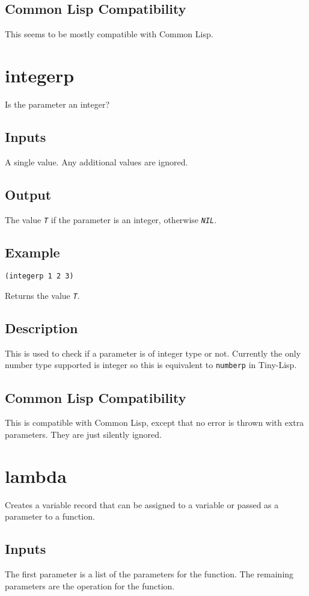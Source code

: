 \documentclass[10pt, openany]{book}
\newcommand{\constant}[1]{\emph{\texttt{#1}}}
\newcommand{\keyword}[1]{\texttt{#1}}
\newcommand{\tl}{Tiny-Lisp}
\newcommand{\cl}{Common Lisp}
\begin{document}
\subsection{Common Lisp Compatibility}
This seems to be mostly compatible with \cl.

\section{integerp}
Is the parameter an integer?
\subsection{Inputs}
A single value.  Any additional values are ignored.
\subsection{Output}
The value \constant{T} if the parameter is an integer, otherwise \constant{NIL}.
\subsection{Example}
\begin{lstlisting}
(integerp 1 2 3)
\end{lstlisting}
Returns the value \constant{T}.
\subsection{Description}
This is used to check if a parameter is of integer type or not.  Currently the only number type supported is integer so this is equivalent to \keyword{numberp} in \tl.
\subsection{Common Lisp Compatibility}
This is compatible with \cl, except that no error is thrown with extra parameters.  They are just silently ignored.

\section{lambda}
Creates a variable record that can be assigned to a variable or passed as a parameter to a function.
\subsection{Inputs}
The first parameter is a list of the parameters for the function.  The remaining parameters are the operation for the function.
\end{document}
